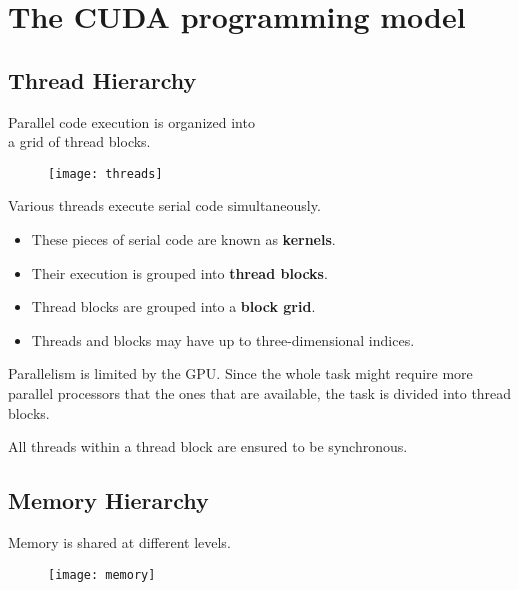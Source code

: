\documentclass[xcolor={dvipsnames}]{beamer}
\begin{document}
\section{The CUDA programming model}

\subsection{Thread Hierarchy}
\begin{frame}{Parallel code execution is organized into\\ a grid of thread blocks.}
\begin{figure}
\centering
\texttt{[image: threads]}
\label{fig:threads}
\end{figure}
\end{frame}

\begin{frame}{Various threads execute serial code simultaneously.}
\begin{itemize}[<+->]
\item These pieces of serial code are known as \textbf{kernels}.
\bigskip
\item Their execution is grouped into \textbf{thread blocks}.
\bigskip
\item Thread blocks are grouped into a \textbf{block grid}.
\bigskip
\item Threads and blocks may have up to three-dimensional indices.
\end{itemize}
\end{frame}

\begin{frame}{Parallelism is limited by the GPU.}
Since the whole task might require more parallel processors that the ones that are available, the task is divided into thread blocks.

\pause
\bigskip
All threads within a thread block are ensured to be synchronous.
\end{frame}

\subsection{Memory Hierarchy}

\begin{frame}{Memory is shared at different levels.}
\begin{figure}
\centering
\texttt{[image: memory]}
\label{fig:memory}
\end{figure}
\end{frame}
\end{document}
